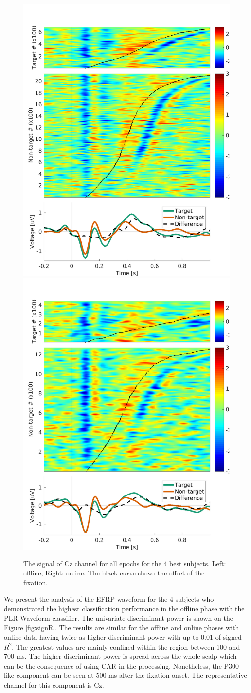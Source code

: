 \documentclass[12pt]{iopart}
\begin{document}
\begin{figure}[!t]
    \includegraphics[trim={0cm 0cm 1.5cm 0cm},clip,width=0.45\columnwidth]{../images/offline/Epochs_GA_chCz_Saggregate_objrec_subjects_popuponline_s1.pdf}
    \includegraphics[trim={0cm 0cm 1.5cm 0cm},clip,width=0.45\columnwidth]{../images/online/Epochs_GA_chCz_Saggregate_objrec_subjects_popuponline_s1.pdf}
    \caption{The signal of Cz channel for all epochs for the 4 best subjects. Left: offline, Right: online.
        The black curve shows the offset of the fixation.
    }
\label{fig:epochsCz}
\end{figure}

We present the analysis of the EFRP waveform for the 4 subjects who demonstrated
the highest classification performance in the offline phase with the PLR-Waveform classifier.
The univariate discriminant power is shown on the Figure \ref{fig:signR}.
The results are similar for the offline and online phases with online data having twice
as higher discriminant power with up to 0.01 of signed $R^2$.
The greatest values are mainly confined within the region between 100 and 700 ms.
The higher discriminant power is spread across the whole scalp which can be the consequence
of using CAR in the processing. Nonetheless, the P300-like component can be seen at 500 ms
after the fixation onset. The representative channel for this component is Cz.
\end{document}
